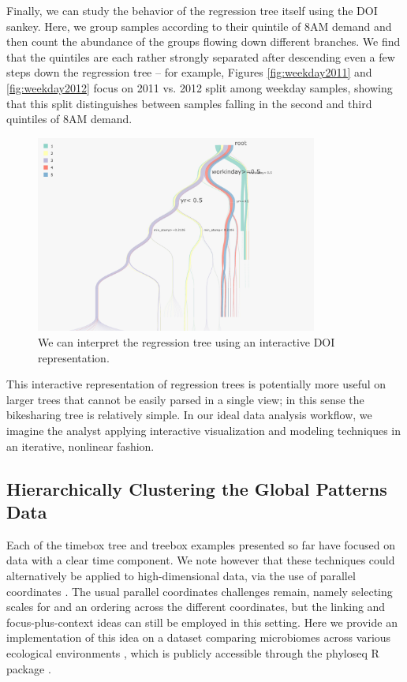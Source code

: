 \documentclass[12pt]{article}
\begin{document}
Finally, we can study the behavior of the regression tree itself using
the DOI sankey. Here, we group samples according to their quintile of
8AM demand and then count the abundance of the groups flowing down
different branches. We find that the quintiles are each rather strongly
separated after descending even a few steps down the regression tree --
for example, Figures \ref{fig:weekday2011} and \ref{fig:weekday2012}
focus on 2011 vs. 2012 split among weekday samples, showing that this
split distinguishes between samples falling in the second and third
quintiles of 8AM demand.

\begin{figure}

{\centering \includegraphics[width=350px]{figure/bike_sankey}

}

\caption{We can interpret the regression tree using an interactive DOI
  representation.}\label{fig:bikesankey}
\end{figure}

This interactive representation of regression trees is potentially more
useful on larger trees that cannot be easily parsed in a single view; in
this sense the bikesharing tree is relatively simple. In our ideal data
analysis workflow, we imagine the analyst applying interactive
visualization and modeling techniques in an iterative, nonlinear
fashion.

\subsection{Hierarchically Clustering the Global Patterns Data}\label{global_patterns}

Each of the timebox tree and treebox examples presented so far have
focused on data with a clear time component. We note however that these
techniques could alternatively be applied to high-dimensional data, via
the use of parallel coordinates \citep{inselberg1991parallel}. The usual
parallel coordinates challenges remain, namely selecting scales for and an
ordering across the different coordinates, but the linking and
focus-plus-context ideas can still be employed in this setting. Here we
provide an implementation of this idea on a dataset comparing microbiomes across
various ecological environments \citep{caporaso2011global}, which is publicly
accessible through the phyloseq R package \citep{mcmurdie2013phyloseq}.
\end{document}
